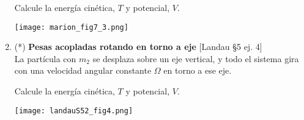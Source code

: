 \documentclass[11pt, spanish, a4paper, twoside]{article}
\begin{document}
\begin{enumerate}
\begin{minipage}[t][7cm]{0.5\textwidth}
Calcule la energía cinética, \(T\) y potencial, \(V\).
\end{minipage}
	\begin{minipage}[c][3cm][t]{0.5\textwidth}
	\texttt{[image: marion\_fig7\_3.png]}
\end{minipage}



\item \begin{minipage}[t][4.5cm]{0.65\textwidth}
(*) \textbf{Pesas acopladas rotando en torno a eje} [Landau \S5 ej. 4]\\
La partícula con \(m_2\) se desplaza sobre un eje vertical, y todo el sistema gira con una velocidad angular constante \(\Omega\) en torno a ese eje.

Calcule la energía cinética, \(T\) y potencial, \(V\).
\end{minipage}
	\begin{minipage}[c][5cm][t]{0.35\textwidth}
	\texttt{[image: landauS52\_fig4.png]}
\end{minipage}



\end{enumerate}
\end{document}
